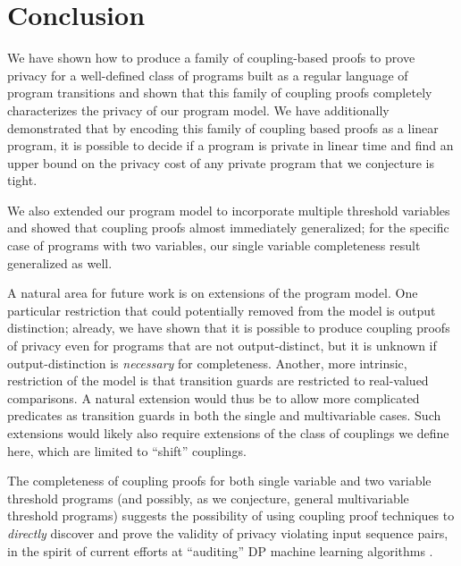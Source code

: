 

\section{Conclusion}
We have shown how to produce a family of coupling-based proofs to prove privacy for a well-defined class of programs built as a regular language of program transitions and shown that this family of coupling proofs completely characterizes the privacy of our program model. 
We have additionally demonstrated that by encoding this family of coupling based proofs as a linear program, it is possible to decide if a program is private in linear time and find an upper bound on the privacy cost of any private program that we conjecture is tight. 

We also extended our program model to incorporate multiple threshold variables and showed that coupling proofs almost immediately generalized; for the specific case of programs with two variables, our single variable completeness result generalized as well. 

A natural area for future work is on extensions of the program model. One particular restriction that could potentially removed from the model is output distinction; already, we have shown that it is possible to produce coupling proofs of privacy even for programs that are not output-distinct, but it is unknown if output-distinction is \textit{necessary} for completeness.
Another, more intrinsic, restriction of the model is that transition guards are restricted to real-valued comparisons. A natural extension would thus be to allow more complicated predicates as transition guards in both the single and multivariable cases. 
Such extensions would likely also require extensions of the class of couplings we define here, which are limited to ``shift'' couplings. 

The completeness of coupling proofs for both single variable and two variable threshold programs (and possibly, as we conjecture, general multivariable threshold programs) suggests the possibility of using coupling proof techniques to \textit{directly} discover and prove the validity of privacy violating input sequence pairs, in the spirit of current efforts at ``auditing'' DP machine learning algorithms \cite{luGeneralFrameworkAuditing2022, steinkePrivacyAuditingOne2023}. 